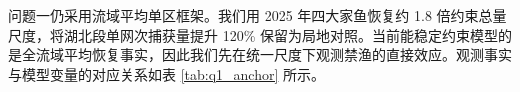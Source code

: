 问题一仍采用流域平均单区框架。我们用 2025 年四大家鱼恢复约 1.8 倍约束总量尺度，将湖北段单网次捕获量提升 120\% 保留为局地对照。当前能稳定约束模型的是全流域平均恢复事实，因此我们先在统一尺度下观测禁渔的直接效应。观测事实与模型变量的对应关系如表 \ref{tab:q1_anchor} 所示。
